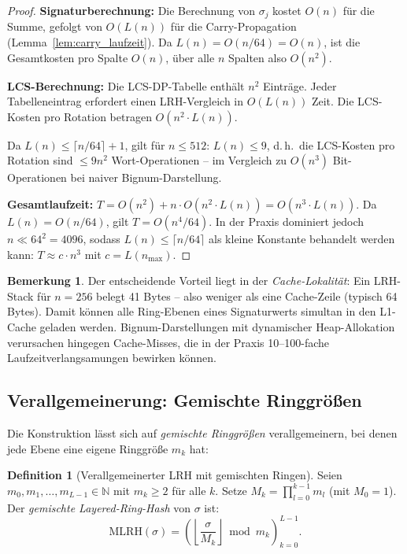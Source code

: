 ﻿\documentclass[a4paper,12pt]{article}
\theoremstyle{definition}
\newtheorem{definition}{Definition}
\newtheorem{bemerkung}{Bemerkung}
\begin{document}
\begin{proof}
\textbf{Signaturberechnung:} Die Berechnung von $\sigma_j$ kostet $O(n)$ für die
Summe, gefolgt von $O(L(n))$ für die Carry-Propagation (Lemma~\ref{lem:carry_laufzeit}).
Da $L(n) = O(n/64) = O(n)$, ist die Gesamtkosten pro Spalte $O(n)$, über alle $n$
Spalten also $O(n^2)$.

\textbf{LCS-Berechnung:} Die LCS-DP-Tabelle enthält $n^2$ Einträge. Jeder
Tabelleneintrag erfordert einen LRH-Vergleich in $O(L(n))$ Zeit.
Die LCS-Kosten pro Rotation betragen $O(n^2 \cdot L(n))$.

Da $L(n) \leq \lceil n/64 \rceil + 1$, gilt für $n \leq 512$: $L(n) \leq 9$,
d.\,h.\ die LCS-Kosten pro Rotation sind $\leq 9 n^2$ Wort-Operationen -- im
Vergleich zu $O(n^3)$ Bit-Operationen bei naiver Bignum-Darstellung.

\textbf{Gesamtlaufzeit:}
$T = O(n^2) + n \cdot O(n^2 \cdot L(n)) = O(n^3 \cdot L(n))$.
Da $L(n) = O(n/64)$, gilt $T = O(n^4 / 64)$. In der Praxis dominiert jedoch
$n \ll 64^2 = 4096$, sodass $L(n) \leq \lceil n/64 \rceil$ als kleine Konstante
behandelt werden kann: $T \approx c \cdot n^3$ mit $c = L(n_{\max})$.
\end{proof}

\begin{bemerkung}
Der entscheidende Vorteil liegt in der \emph{Cache-Lokalität}: Ein LRH-Stack für
$n=256$ belegt 41 Bytes -- also weniger als eine Cache-Zeile (typisch 64 Bytes).
Damit können alle Ring-Ebenen eines Signaturwerts simultan in den L1-Cache geladen
werden. Bignum-Darstellungen mit dynamischer Heap-Allokation verursachen hingegen
Cache-Misses, die in der Praxis 10--100-fache Laufzeitverlangsamungen bewirken können.
\end{bemerkung}

\subsection{Verallgemeinerung: Gemischte Ringgrößen}

Die Konstruktion lässt sich auf \emph{gemischte Ringgrößen} verallgemeinern, bei
denen jede Ebene eine eigene Ringgröße $m_k$ hat:

\begin{definition}[Verallgemeinerter LRH mit gemischten Ringen]
Seien $m_0, m_1, \ldots, m_{L-1} \in \mathbb{N}$ mit $m_k \geq 2$ für alle $k$.
Setze $M_k = \prod_{l=0}^{k-1} m_l$ (mit $M_0 = 1$). Der
\emph{gemischte Layered-Ring-Hash} von $\sigma$ ist:
\[
  \mathrm{MLRH}(\sigma) = \left(
    \left\lfloor \frac{\sigma}{M_k} \right\rfloor \bmod m_k
  \right)_{k=0}^{L-1}.
\]
\end{definition}
\end{document}

